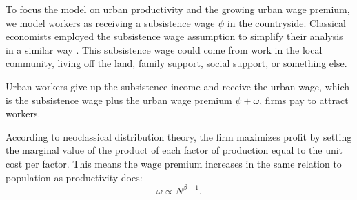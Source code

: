 To focus the model on urban productivity and the growing urban wage premium, we model workers as receiving a \gls{subsistence wage} $\psi$ in the countryside. Classical economists employed the \gls{subsistence wage} assumption to simplify their analysis in a similar way \cite{GET_classical-subsistence-wage}. This subsistence wage could come from work in the local community, living off the land, family support, social support, or something else. 

Urban workers give up the subsistence income and receive the \gls{urban wage}, which is the subsistence wage plus the \gls{urban wage premium} $\psi +  \omega$, firms pay to attract workers. 


According to \gls{neoclassical distribution theory}, the firm maximizes profit by setting the marginal value of the product of each \gls{factor of production} equal to the unit cost per factor. This means the wage premium increases in the same relation to population as \gls{productivity} does:
\begin{equation}
\omega\propto N^{\beta-1}.
\label{eqn-wage-population}
\end{equation}


